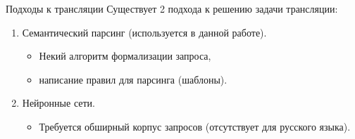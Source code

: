 \begin{frame}[fragile]{Подходы к трансляции}%
  Существует 2 подхода к решению задачи трансляции:
  \begin{enumerate}%
    \item Семантический парсинг (используется в данной работе).
      \begin{itemize}%
        \item Некий алгоритм формализации запроса,
        \item написание правил для парсинга (шаблоны).
      \end{itemize}
    \item Нейронные сети.
      \begin{itemize}%
        \item Требуется обширный корпус запросов (отсутствует для русского языка).
      \end{itemize}
  \end{enumerate}
\end{frame}
